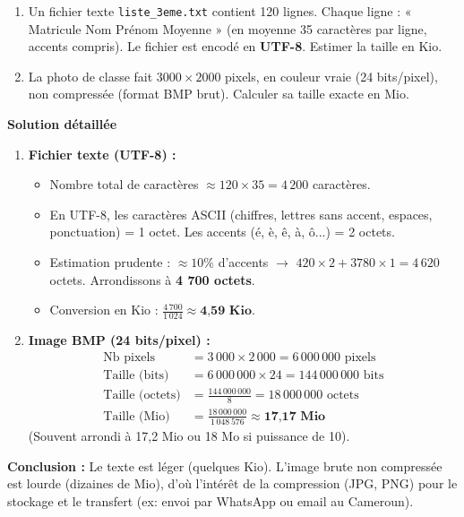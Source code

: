 \documentclass[11pt]{article}
\begin{document}
\begin{exoresolu}
    \begin{enumerate}
        \item Un fichier texte \texttt{liste\_3eme.txt} contient 120 lignes. Chaque ligne : « Matricule Nom Prénom Moyenne » (en moyenne 35 caractères par ligne, accents compris). Le fichier est encodé en \textbf{UTF-8}. Estimer la taille en Kio.
        \item La photo de classe fait $3000 \times 2000$ pixels, en couleur vraie (24 bits/pixel), non compressée (format BMP brut). Calculer sa taille exacte en Mio.
    \end{enumerate}
    \tcblower
    \textbf{Solution détaillée}
    \begin{enumerate}
        \item \textbf{Fichier texte (UTF-8) :}
        \begin{itemize}
            \item Nombre total de caractères $\approx 120 \times 35 = 4\,200$ caractères.
            \item En UTF-8, les caractères ASCII (chiffres, lettres sans accent, espaces, ponctuation) = 1 octet. Les accents (é, è, ê, à, ô...) = 2 octets.
            \item Estimation prudente : $\approx 10\%$ d'accents $\to$ $420 \times 2 + 3780 \times 1 = 4\,620$ octets. Arrondissons à \textbf{4 700 octets}.
            \item Conversion en Kio : $\frac{4\,700}{1\,024} \approx \textbf{4,59 Kio}$.
        \end{itemize}
        \item \textbf{Image BMP (24 bits/pixel) :}
        \begin{align*}
        \text{Nb pixels} &= 3\,000 \times 2\,000 = 6\,000\,000 \text{ pixels} \\
        \text{Taille (bits)} &= 6\,000\,000 \times 24 = 144\,000\,000 \text{ bits} \\
        \text{Taille (octets)} &= \frac{144\,000\,000}{8} = 18\,000\,000 \text{ octets} \\
        \text{Taille (Mio)} &= \frac{18\,000\,000}{1\,048\,576} \approx \textbf{17,17 Mio}
        \end{align*}
        (Souvent arrondi à 17,2 Mio ou 18 Mo si puissance de 10).
    \end{enumerate}
    \textbf{Conclusion :} Le texte est léger (quelques Kio). L'image brute non compressée est lourde (dizaines de Mio), d'où l'intérêt de la compression (JPG, PNG) pour le stockage et le transfert (ex: envoi par WhatsApp ou email au Cameroun).
\end{exoresolu}
\end{document}

